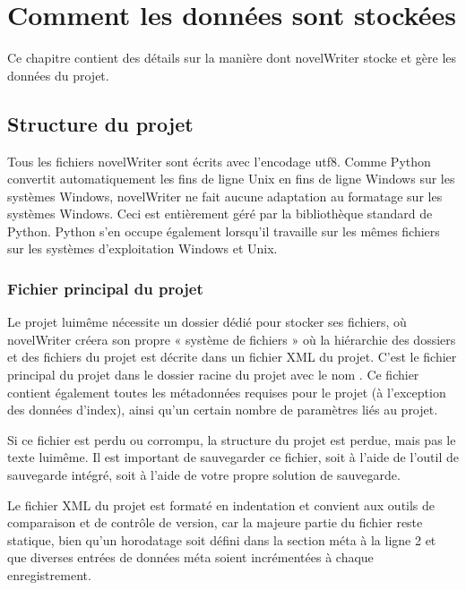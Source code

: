 \documentclass[a4paper,11pt,french]{sphinxmanual}
\begin{document}
\sphinxstepscope


\chapter{Comment les données sont stockées}
\label{\detokenize{tech_storage:how-data-is-stored}}\label{\detokenize{tech_storage:a-storage}}\label{\detokenize{tech_storage::doc}}
\sphinxAtStartPar
Ce chapitre contient des détails sur la manière dont novelWriter stocke et gère les données du projet.


\section{Structure du projet}
\label{\detokenize{tech_storage:project-structure}}
\sphinxAtStartPar
Tous les fichiers novelWriter sont écrits avec l’encodage utf\sphinxhyphen{}8. Comme Python convertit automatiquement les fins de ligne Unix en fins de ligne Windows sur les systèmes Windows, novelWriter ne fait aucune adaptation au formatage sur les systèmes Windows. Ceci est entièrement géré par la bibliothèque standard de Python. Python s’en occupe également lorsqu’il travaille sur les mêmes fichiers sur les systèmes d’exploitation Windows et Unix.


\subsection{Fichier principal du projet}
\label{\detokenize{tech_storage:main-project-file}}
\sphinxAtStartPar
Le projet lui\sphinxhyphen{}même nécessite un dossier dédié pour stocker ses fichiers, où novelWriter créera son propre « système de fichiers » où la hiérarchie des dossiers et des fichiers du projet est décrite dans un fichier XML du projet. C’est le fichier principal du projet dans le dossier racine du projet avec le nom . Ce fichier contient également toutes les métadonnées requises pour le projet (à l’exception des données d’index), ainsi qu’un certain nombre de paramètres liés au projet.

\sphinxAtStartPar
Si ce fichier est perdu ou corrompu, la structure du projet est perdue, mais pas le texte lui\sphinxhyphen{}même. Il est important de sauvegarder ce fichier, soit à l’aide de l’outil de sauvegarde intégré, soit à l’aide de votre propre solution de sauvegarde.

\sphinxAtStartPar
Le fichier XML du projet est formaté en indentation et convient aux outils de comparaison et de contrôle de version, car la majeure partie du fichier reste statique, bien qu’un horodatage soit défini dans la section méta à la ligne 2 et que diverses entrées de données méta soient incrémentées à chaque enregistrement.
\end{document}
